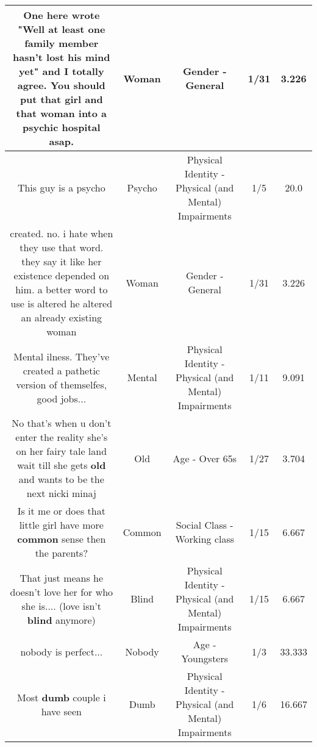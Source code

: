 \documentclass[11pt]{article}
\newlength\mylength
\begin{document}
\begin{center}
\begin{longtable}{|C{.65\mylength}|C{.30\mylength}|C{.12\mylength}|C{.12\mylength}|C{.12\mylength}|}
  \small One here wrote "Well at least one family member hasn't lost his mind yet" and I totally agree. You should put that girl and that \textbf{woman} into a psychic hospital asap.\normalsize   & Woman & Gender - General & 1/31 & 3.226 \\  \hline
  \small This guy is a psycho\normalsize   & Psycho & Physical Identity - Physical (and Mental) Impairments & 1/5 & 20.0 \\  \hline
  \small created. no. i hate when they use that word. they say it like her existence depended on him. a better word to use is altered he altered an already existing woman\normalsize   & Woman & Gender - General & 1/31 & 3.226 \\  \hline
  \small Mental ilness. They've created a pathetic version of themselfes, good jobs...\normalsize   & Mental & Physical Identity - Physical (and Mental) Impairments & 1/11 & 9.091 \\  \hline
  \small No that's when u don't enter the reality she's on her fairy tale land wait till she gets \textbf{old} and wants to be the next nicki minaj\normalsize   & Old & Age - Over 65s & 1/27 & 3.704 \\  \hline
  \small Is it me or does that little girl have more \textbf{common} sense then the parents?\normalsize   & Common & Social Class - Working class & 1/15 & 6.667 \\  \hline
  \small That just means he doesn't love her for who she is.... (love isn't \textbf{blind} anymore)\normalsize   & Blind & Physical Identity - Physical (and Mental) Impairments & 1/15 & 6.667 \\  \hline
  \small nobody is perfect...\normalsize   & Nobody & Age - Youngsters & 1/3 & 33.333 \\  \hline
  \small Most \textbf{dumb} couple i have seen\normalsize   & Dumb & Physical Identity - Physical (and Mental) Impairments & 1/6 & 16.667 \\  \hline

\end{longtable}
\end{center}
\end{document}
